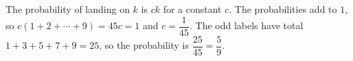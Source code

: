 The probability of landing on $k$ is $ck$ for a constant $c$. The probabilities add to $1$, so $c(1+2+\cdots+9)=45c=1$ and $c=\dfrac{1}{45}$. The odd labels have total $1+3+5+7+9=25$, so the probability is $\dfrac{25}{45}=\boxed{\dfrac{5}{9}}$.
